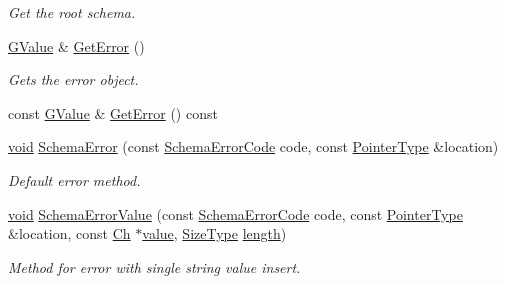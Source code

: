 \begin{DoxyCompactItemize}
\begin{DoxyCompactList}\small\item\em Get the root schema. \end{DoxyCompactList}\item 
\hyperlink{classGenericSchemaDocument_a777505b09fff6cf23b8cfed9e0350eec}{G\+Value} \& \hyperlink{classGenericSchemaDocument_a2e3e3628b352678ff459f6e4ad613ba4}{Get\+Error} ()
\begin{DoxyCompactList}\small\item\em Gets the error object. \end{DoxyCompactList}\item 
const \hyperlink{classGenericSchemaDocument_a777505b09fff6cf23b8cfed9e0350eec}{G\+Value} \& \hyperlink{classGenericSchemaDocument_a03bdd7040e3aa840678d4fc05d3624c0}{Get\+Error} () const
\item 
\hyperlink{imgui__impl__opengl3__loader_8h_ac668e7cffd9e2e9cfee428b9b2f34fa7}{void} \hyperlink{classGenericSchemaDocument_a78661bc8f6e235a06f803e8d53e823c2}{Schema\+Error} (const \hyperlink{group__RAPIDJSON__ERRORS_ga64f496d2cee8c9673f3105ec6008f290}{Schema\+Error\+Code} code, const \hyperlink{classGenericSchemaDocument_aeb62f562d4dc024402b00f97cbcef747}{Pointer\+Type} \&location)
\begin{DoxyCompactList}\small\item\em Default error method. \end{DoxyCompactList}\item 
\hyperlink{imgui__impl__opengl3__loader_8h_ac668e7cffd9e2e9cfee428b9b2f34fa7}{void} \hyperlink{classGenericSchemaDocument_a99e6557e5945ca5a003f025a33b4ac76}{Schema\+Error\+Value} (const \hyperlink{group__RAPIDJSON__ERRORS_ga64f496d2cee8c9673f3105ec6008f290}{Schema\+Error\+Code} code, const \hyperlink{classGenericSchemaDocument_aeb62f562d4dc024402b00f97cbcef747}{Pointer\+Type} \&location, const \hyperlink{classGenericSchemaDocument_ab1dec56a78b29649eb8e4b85b101ec7c}{Ch} $\ast$\hyperlink{imgui__impl__opengl3__loader_8h_a32aff7c6c4cd253fdf6563677afab5ce}{value}, \hyperlink{rapidjson_8h_a5ed6e6e67250fadbd041127e6386dcb5}{Size\+Type} \hyperlink{imgui__impl__opengl3__loader_8h_a011fc24f10426c01349e94a4edd4b0d5}{length})
\begin{DoxyCompactList}\small\item\em Method for error with single string value insert. \end{DoxyCompactList}\item 

\end{DoxyCompactItemize}
